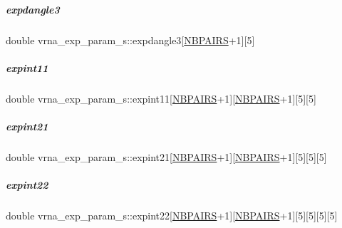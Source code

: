 \mbox{\label{group__energy__parameters_a4dd91ccea8929e4779be114b9b76b28f}} 
\subparagraph{\texorpdfstring{expdangle3}{expdangle3}}
{\footnotesize\ttfamily double vrna\+\_\+exp\+\_\+param\+\_\+s\+::expdangle3\mbox{[}\mbox{\hyperlink{energy__const_8h_a5e75221c779d618eab81e096f37e32ce}{N\+B\+P\+A\+I\+RS}}+1\mbox{]}\mbox{[}5\mbox{]}}

\mbox{\label{group__energy__parameters_ae58abb197b8bfb624513cb28858a8dab}} 
\subparagraph{\texorpdfstring{expint11}{expint11}}
{\footnotesize\ttfamily double vrna\+\_\+exp\+\_\+param\+\_\+s\+::expint11\mbox{[}\mbox{\hyperlink{energy__const_8h_a5e75221c779d618eab81e096f37e32ce}{N\+B\+P\+A\+I\+RS}}+1\mbox{]}\mbox{[}\mbox{\hyperlink{energy__const_8h_a5e75221c779d618eab81e096f37e32ce}{N\+B\+P\+A\+I\+RS}}+1\mbox{]}\mbox{[}5\mbox{]}\mbox{[}5\mbox{]}}

\mbox{\label{group__energy__parameters_acb992a6f846f0d1720b111606d819164}} 
\subparagraph{\texorpdfstring{expint21}{expint21}}
{\footnotesize\ttfamily double vrna\+\_\+exp\+\_\+param\+\_\+s\+::expint21\mbox{[}\mbox{\hyperlink{energy__const_8h_a5e75221c779d618eab81e096f37e32ce}{N\+B\+P\+A\+I\+RS}}+1\mbox{]}\mbox{[}\mbox{\hyperlink{energy__const_8h_a5e75221c779d618eab81e096f37e32ce}{N\+B\+P\+A\+I\+RS}}+1\mbox{]}\mbox{[}5\mbox{]}\mbox{[}5\mbox{]}\mbox{[}5\mbox{]}}

\mbox{\label{group__energy__parameters_aa8e5d06b019fb91bf7f1b866e5349fb6}} 
\subparagraph{\texorpdfstring{expint22}{expint22}}
{\footnotesize\ttfamily double vrna\+\_\+exp\+\_\+param\+\_\+s\+::expint22\mbox{[}\mbox{\hyperlink{energy__const_8h_a5e75221c779d618eab81e096f37e32ce}{N\+B\+P\+A\+I\+RS}}+1\mbox{]}\mbox{[}\mbox{\hyperlink{energy__const_8h_a5e75221c779d618eab81e096f37e32ce}{N\+B\+P\+A\+I\+RS}}+1\mbox{]}\mbox{[}5\mbox{]}\mbox{[}5\mbox{]}\mbox{[}5\mbox{]}\mbox{[}5\mbox{]}}

